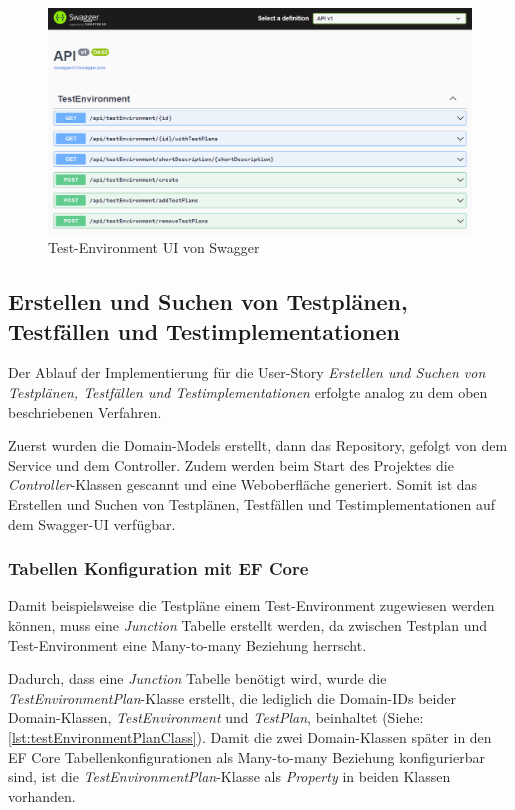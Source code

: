 \documentclass[a4paper, fontsize=11pt, parskip=half, twoside]{scrreprt}
\begin{document}
	\begin{figure}[ht]
		\centering
		\includegraphics[scale=0.5]{assets/swaggerui_testenvironment.png}
		\caption{Test-Environment \ac{UI} von Swagger}
		\label{fig:swaggeruiTestenvironment}
	\end{figure}
	
	\subsection{Erstellen und Suchen von Testplänen, Testfällen und Testimplementationen} \label{subsec:createAndSearchTestplans}
	Der Ablauf der Implementierung für die User-Story \emph{Erstellen und Suchen von Testplänen, Testfällen und Testimplementationen} erfolgte analog zu dem oben beschriebenen Verfahren.
	
	Zuerst wurden die Domain-Models erstellt, dann das Repository, gefolgt von dem Service und dem Controller.
	Zudem werden beim Start des Projektes die \emph{Controller}-Klassen gescannt und eine Weboberfläche generiert.
	Somit ist das Erstellen und Suchen von Testplänen, Testfällen und Testimplementationen auf dem Swagger-UI verfügbar. 
	
	\subsubsection{Tabellen Konfiguration mit EF Core}
	Damit beispielsweise die Testpläne einem Test-Environment zugewiesen werden können, muss eine \emph{Junction} Tabelle erstellt werden, da zwischen Testplan und Test-Environment eine Many-to-many Beziehung herrscht.
	
	Dadurch, dass eine \emph{Junction} Tabelle benötigt wird, wurde die \emph{TestEnvironmentPlan}-Klasse erstellt, die lediglich die Domain-\ac{ID}s beider Domain-Klassen, \emph{TestEnvironment} und \emph{TestPlan}, beinhaltet (Siehe: \autoref{lst:testEnvironmentPlanClass}). 
	Damit die zwei Domain-Klassen später in den \ac{EF} Core Tabellenkonfigurationen als Many-to-many Beziehung konfigurierbar sind, ist die \emph{TestEnvironmentPlan}-Klasse als \emph{Property} in beiden Klassen vorhanden.
	
\end{document}
